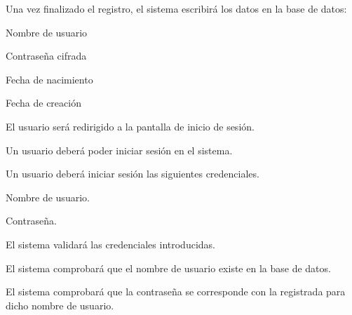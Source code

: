 \begin{RFGestionUsuarios}
\begin{RFGestionUsuarios}
\begin{RFGestionUsuarios}
			\end{RFGestionUsuarios}
		\item Una vez finalizado el registro, el sistema escribirá los datos en la base de datos:
			\begin{RFGestionUsuarios}
				\item Nombre de usuario
				\item Contraseña cifrada
				\item Fecha de nacimiento
				\item Fecha de creación
				\item {}
				\item {}
				\item {}
			\end{RFGestionUsuarios}

		\item El usuario será redirigido a la pantalla de inicio de sesión.
	\end{RFGestionUsuarios}

	\item Un usuario deberá poder iniciar sesión en el sistema.\label{req_inicio_sesion}
    \begin{RFGestionUsuarios}%
      \item Un usuario deberá iniciar sesión las siguientes credenciales.
		\begin{RFGestionUsuarios}
		  \item Nombre de usuario.
		  \item Contraseña.
		\end{RFGestionUsuarios}
	  \item El sistema validará las credenciales introducidas.
		\begin{RFGestionUsuarios}
			\item El sistema comprobará que el nombre de usuario existe en la base de datos.
			\item El sistema comprobará que la contraseña se corresponde con la registrada para dicho nombre de usuario.
		\end{RFGestionUsuarios}


\end{RFGestionUsuarios}
\end{RFGestionUsuarios}
